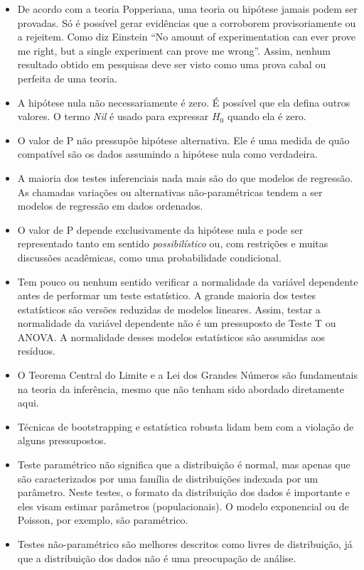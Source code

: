 \documentclass[
]{book}
\begin{document}
\begin{itemize}
\item
  De acordo com a teoria Popperiana, uma teoria ou hipótese jamais podem ser provadas. Só é possível gerar evidências que a corroborem provisoriamente ou a rejeitem. Como diz Einstein ``No amount of experimentation can ever prove me right, but a single experiment can prove me wrong''. Assim, nenhum resultado obtido em pesquisas deve ser visto como uma prova cabal ou perfeita de uma teoria.
\item
  A hipótese nula não necessariamente é zero. É possível que ela defina outros valores. O termo \emph{Nil} é usado para expressar \(H_0\) quando ela é zero.
\item
  O valor de P não pressupõe hipótese alternativa. Ele é uma medida de quão compatível são os dados assumindo a hipótese nula como verdadeira.
\item
  A maioria dos testes inferenciais nada mais são do que modelos de regressão. As chamadas variações ou alternativas não-paramétricas tendem a ser modelos de regressão em dados ordenados.
\item
  O valor de P depende exclusivamente da hipótese nula e pode ser representado tanto em sentido \emph{possibilístico} ou, com restrições e muitas discussões acadêmicas, como uma probabilidade condicional.
\item
  Tem pouco ou nenhum sentido verificar a normalidade da variável dependente antes de performar um teste estatístico. A grande maioria dos testes estatísticos são versões reduzidas de modelos lineares. Assim, testar a normalidade da variável dependente não é um pressuposto de Teste T ou ANOVA. A normalidade desses modelos estatísticos são assumidas aos resíduos.
\item
  O Teorema Central do Limite e a Lei dos Grandes Números são fundamentais na teoria da inferência, mesmo que não tenham sido abordado diretamente aqui.
\item
  Técnicas de bootstrapping e estatística robusta lidam bem com a violação de alguns pressupostos.
\item
  Teste paramétrico não significa que a distribuição é normal, mas apenas que são caracterizados por uma família de distribuições indexada por um parâmetro. Neste testes, o formato da distribuição dos dados é importante e eles visam estimar parâmetros (populacionais). O modelo exponencial ou de Poisson, por exemplo, são paramétrico.
\item
  Testes não-paramétrico são melhores descritos como livres de distribuição, já que a distribuição dos dados não é uma preocupação de análise.
\end{itemize}
\end{document}
